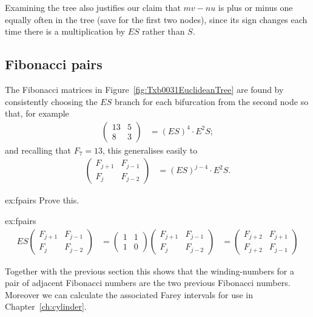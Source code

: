  Examining the tree also justifies our claim that $m v-nu$ is plus or minus one equally often in the tree (save for the first two nodes), since its sign changes each time there is a multiplication by $ES$ rather than $S$.


\subsection{Fibonacci pairs}
\label{sec:euclidean}
The Fibonacci matrices in Figure~\ref{fig:Txb0031EuclideanTree} are found by consistently choosing the $ES$ branch for each bifurcation from the second node so that, for example
\begin{align*}
	\begin{pmatrix} 
	13 & 5 
		\\
		8 & 3
	\end{pmatrix} &= 	(E S)^{{4}} \cdot E^2 S ;
\end{align*}
and recalling that $F_{7}=13$, this generalises easily to
\begin{align}
	\begin{pmatrix} 
		F_{j+1} & F_{j-1} 
		\\
		F _j & F_{j-2}
	\end{pmatrix} &= 	(E S)^{{j-4}} \cdot E^2 S.
\label{eq:FibonacciMatrix}
\end{align}
%
\begin{jExercise}{ex:fpairs}
	Prove this.
\end{jExercise}
%
\begin{jAnswer}{ex:fpairs} 
\begin{align}
E S \begin{pmatrix} 	F_{j+1} & F_{j-1} 	\\	F _j & F_{j-2}\end{pmatrix}
  &= 	\begin{pmatrix} 1 & 1\\1 & 0 \end{pmatrix}
\begin{pmatrix} F_{j+1} & F_{j-1} \\F _j & F_{j-2}\end{pmatrix}
&= 
\begin{pmatrix} 	F_{j+2} & F_{j+1} 	\\	F _{j+2} & F_{j-1}
\end{pmatrix}
\end{align}
\end{jAnswer}
%
Together with the previous section this shows that the winding-numbers for a pair of adjacent Fibonacci numbers are the two previous Fibonacci numbers.
Moreover we can calculate the associated Farey intervals for use in Chapter~\ref{ch:cylinder}.


